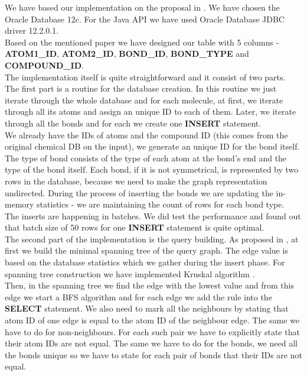 {We have based our implementation on the proposal in \cite{SQL}. We have chosen the Oracle Database 12c. For the Java API we have used Oracle Database JDBC driver 12.2.0.1.\\

Based on the mentioned paper we have designed our table with 5 columns - \textbf{ATOM1\_ID}, \textbf{ATOM2\_ID}, \textbf{BOND\_ID}, \textbf{BOND\_TYPE} and \break \textbf{COMPOUND\_ID}.\\


The implementation itself is quite straightforward and it consist of two parts. The first part is a routine for the database creation. In this routine we just iterate through the whole database and for each molecule, at first, we iterate through all its atoms and assign an unique ID to each of them. Later, we iterate through all the bonds and for each we create one \textbf{INSERT} statement.\\

We already have the IDs of atoms and the compound ID (this comes from the original chemical DB on the input), we generate an unique ID for the bond itself. The type of bond consists of the type of each atom at the bond's end and the type of the bond itself. Each bond, if it is not symmetrical, is represented by two rows in the database, because we need to make the graph representation undirected. During the process of inserting the bonds we are updating the in-memory statistics - we are maintaining the count of rows for each bond type.\\

The inserts are happening in batches. We did test the performance and found out that batch size of 50 rows for one \textbf{INSERT} statement is quite optimal.\\

The second part of the implementation is the query building. As proposed in \cite{SQL}, at first we build the minimal spanning tree of the query graph. The edge value is based on the database statistics which we gather during the insert phase. For spanning tree construction we have implemented Kruskal algorithm \cite{kruskal}.\\

Then, in the spanning tree we find the edge with the lowest value and from this edge we start a BFS algorithm and for each edge we add the rule into the \textbf{SELECT} statement. We also need to mark all the neighbours by stating that atom ID of one edge is equal to the atom ID of the neighbour edge. The same we have to do for non-neighbours. For each such pair we have to explicitly state that their atom IDs are not equal. The same we have to do for the bonds, we need all the bonds unique so we have to state for each pair of bonds that their IDs are not equal.\\

}

